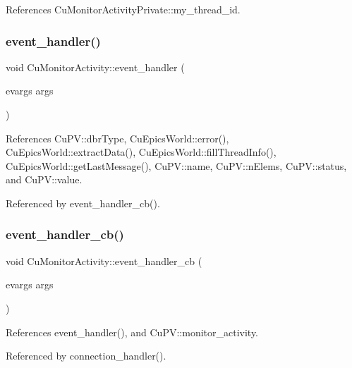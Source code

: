 References Cu\+Monitor\+Activity\+Private\+::my\+\_\+thread\+\_\+id.

\mbox{\label{classCuMonitorActivity_a3c754227c64d922e1f3b0e0a9287c1f4}} 
\subsubsection{event\+\_\+handler()}
{\footnotesize\ttfamily void Cu\+Monitor\+Activity\+::event\+\_\+handler (\begin{DoxyParamCaption}\item[{evargs}]{args }\end{DoxyParamCaption})}



References Cu\+P\+V\+::dbr\+Type, Cu\+Epics\+World\+::error(), Cu\+Epics\+World\+::extract\+Data(), Cu\+Epics\+World\+::fill\+Thread\+Info(), Cu\+Epics\+World\+::get\+Last\+Message(), Cu\+P\+V\+::name, Cu\+P\+V\+::n\+Elems, Cu\+P\+V\+::status, and Cu\+P\+V\+::value.



Referenced by event\+\_\+handler\+\_\+cb().

\mbox{\label{classCuMonitorActivity_a72f2cce818ca383a5d0eba77baa14838}} 
\subsubsection{event\+\_\+handler\+\_\+cb()}
{\footnotesize\ttfamily void Cu\+Monitor\+Activity\+::event\+\_\+handler\+\_\+cb (\begin{DoxyParamCaption}\item[{evargs}]{args }\end{DoxyParamCaption})\hspace{0.3cm}{\ttfamily [static]}}



References event\+\_\+handler(), and Cu\+P\+V\+::monitor\+\_\+activity.



Referenced by connection\+\_\+handler().

\mbox{\label{classCuMonitorActivity_a2a673ca8237588df5d6722ec325bd466}} 
